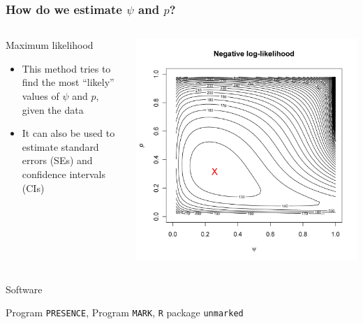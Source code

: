 \documentclass[color=usenames,dvipsnames]{beamer}\usepackage[]{graphicx}\usepackage[]{color}
\begin{document}
\begin{frame}
  \frametitle{How do we estimate $\psi$ and $p$?}
  \pause
  \begin{columns}
    \begin{column}{0.6\textwidth}
      \large {%
        Maximum likelihood \par}
      \large
      \begin{itemize}%
      \item This method tries to find the most ``likely'' values of
        $\psi$ and $p$, given the data
      \item It can also be used to estimate standard errors (SEs) and
        confidence intervals (CIs)
      \end{itemize}
    \end{column}
    \pause
    \begin{column}{0.4\textwidth}
      \includegraphics[width=\textwidth]{figs/mlePandPsi}
    \end{column}
  \end{columns}
  \pause
  {%
    Software \par}
  Program {\tt PRESENCE}, Program {\tt MARK}, {\tt R} package {\tt unmarked}
\end{frame}
\end{document}
